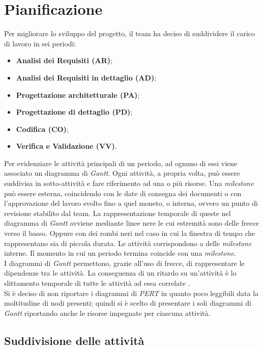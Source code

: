 \newpage
\section{Pianificazione}
Per migliorare lo sviluppo del progetto, il team ha deciso di suddividere il carico di lavoro in sei periodi:
\begin{itemize}
	\item \textbf{Analisi dei Requisiti (AR)};
	\item \textbf{Analisi dei Requisiti in dettaglio (AD)};
	\item \textbf{Progettazione architetturale (PA)};
	\item \textbf{Progettazione di dettaglio (PD)};
	\item \textbf{Codifica (CO)};
	\item \textbf{Verifica e Validazione (VV)}.
\end{itemize}

Per evidenziare le attività principali di un periodo, ad ognuno di essi viene associato un diagramma di \textit{Gantt}. 
Ogni attività, a propria volta, può essere suddivisa in sotto-attività e fare riferimento ad una o più risorse.
Una \textit{milestone} può essere esterna, coincidendo con le date di consegna dei documenti o con l'approvazione del lavoro svolto fino a quel moneto, o interna, ovvero un punto di revisione stabilito dal team. 
La rappresentazione temporale di queste nel diagramma di \textit{Gantt} avviene mediante linee nere le cui estremità sono delle frecce verso il basso. 
Oppure con dei rombi neri nel caso in cui la finestra di tempo che rappresentano sia di piccola durata. 
Le attività corrispondono a delle \textit{milestone} interne. 
Il momento in cui un periodo termina coincide con una \textit{milestone}.\\
I diagrammi di \textit{Gantt} permettono, grazie all'uso di frecce, di rappresentare le dipendenze tra le attività.
La conseguenza di un ritardo su un'attività è lo slittamento temporale di tutte le attività ad essa correlate . \\
Si è deciso di non riportare i diagrammi di \textit{PERT} in quanto poco leggibili data la moltitudine
di nodi presenti; quindi si è scelto di presentare i soli diagrammi di \textit{Gantt} riportando anche le
risorse impegnate per ciascuna attività.




\subsection{Suddivisione delle attività}

